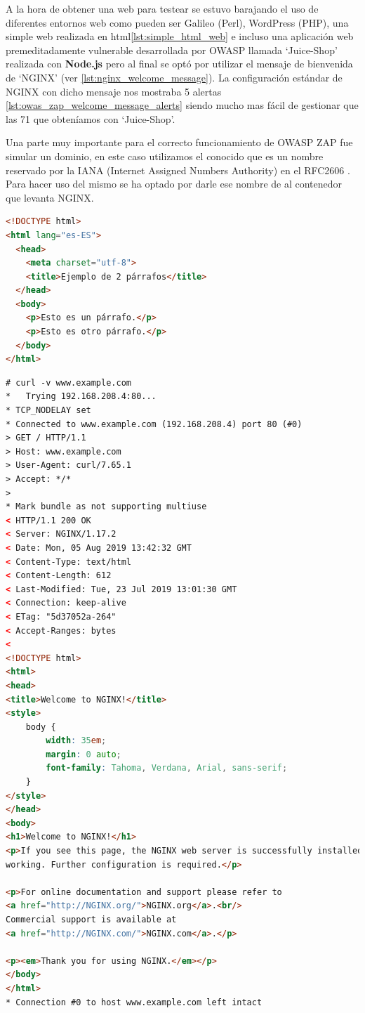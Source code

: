 \bigskip
A la hora de obtener una web para testear se estuvo barajando el uso de diferentes entornos web como pueden ser Galileo (Perl), WordPress (PHP), una simple web realizada en html\ref{lst:simple_html_web} e incluso una aplicación web premeditadamente vulnerable desarrollada por OWASP llamada `Juice-Shop' realizada con \textbf{Node.js} pero al final se optó por utilizar el mensaje de bienvenida de `NGINX' (ver \ref{lst:nginx_welcome_message}). La configuración estándar de NGINX con dicho mensaje nos mostraba 5 alertas \ref{lst:owas_zap_welcome_message_alerts} siendo mucho mas fácil de gestionar que las 71 que obteníamos con `Juice-Shop'.

\bigskip
Una parte muy importante para el correcto funcionamiento de OWASP ZAP fue simular un dominio, en este caso utilizamos el conocido  que es un nombre reservado por la IANA (Internet Assigned Numbers Authority) en el RFC2606 \cite{eastlake_reserved_1999}. Para hacer uso del mismo se ha optado por darle ese nombre de  al contenedor que levanta NGINX.


\begin{lstlisting}[language=html, label={lst:simple_html_web},caption={Web sencilla realizada en HTML puro}]
<!DOCTYPE html>
<html lang="es-ES">
  <head>
    <meta charset="utf-8">
    <title>Ejemplo de 2 párrafos</title>
  </head>
  <body>
    <p>Esto es un párrafo.</p>
    <p>Esto es otro párrafo.</p>
  </body>
</html>
\end{lstlisting}

\begin{lstlisting}[language=html, label={lst:nginx_welcome_message},caption={Mensaje de bienvenida de NGINX}]
# curl -v www.example.com
*   Trying 192.168.208.4:80...
* TCP_NODELAY set
* Connected to www.example.com (192.168.208.4) port 80 (#0)
> GET / HTTP/1.1
> Host: www.example.com
> User-Agent: curl/7.65.1
> Accept: */*
>
* Mark bundle as not supporting multiuse
< HTTP/1.1 200 OK
< Server: NGINX/1.17.2
< Date: Mon, 05 Aug 2019 13:42:32 GMT
< Content-Type: text/html
< Content-Length: 612
< Last-Modified: Tue, 23 Jul 2019 13:01:30 GMT
< Connection: keep-alive
< ETag: "5d37052a-264"
< Accept-Ranges: bytes
<
<!DOCTYPE html>
<html>
<head>
<title>Welcome to NGINX!</title>
<style>
    body {
        width: 35em;
        margin: 0 auto;
        font-family: Tahoma, Verdana, Arial, sans-serif;
    }
</style>
</head>
<body>
<h1>Welcome to NGINX!</h1>
<p>If you see this page, the NGINX web server is successfully installed and
working. Further configuration is required.</p>

<p>For online documentation and support please refer to
<a href="http://NGINX.org/">NGINX.org</a>.<br/>
Commercial support is available at
<a href="http://NGINX.com/">NGINX.com</a>.</p>

<p><em>Thank you for using NGINX.</em></p>
</body>
</html>
* Connection #0 to host www.example.com left intact
\end{lstlisting}

